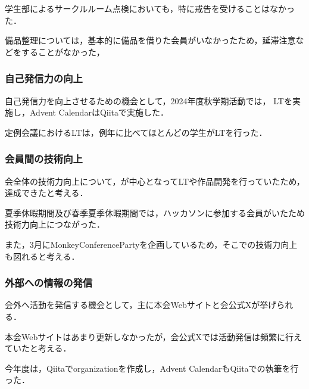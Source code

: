     学生部によるサークルルーム点検においても，特に戒告を受けることはなかった．


    備品整理については，基本的に備品を借りた会員がいなかったため，延滞注意などをすることがなかった，


\subsubsection*{自己発信力の向上}
    自己発信力を向上させるための機会として，2024年度秋学期活動では，
    LTを実施し，Advent CalendarはQiitaで実施した．

    定例会議におけるLTは，例年に比べてほとんどの学生がLTを行った．

\subsubsection*{会員間の技術向上}
    会全体の技術力向上について，\firstGrade{}が中心となってLTや作品開発を行っていたため，達成できたと考える．

    夏季休暇期間及び春季夏季休暇期間では，ハッカソンに参加する会員がいたため技術力向上につながった．

    また，3月にMonkeyConferencePartyを企画しているため，そこでの技術力向上も図れると考える．

\subsubsection*{外部への情報の発信}
    会外へ活動を発信する機会として，主に本会Webサイトと会公式Xが挙げられる．

    本会Webサイトはあまり更新しなかったが，会公式Xでは活動発信は頻繁に行えていたと考える．

    今年度は，Qiitaでorganizationを作成し，Advent CalendarもQiitaでの執筆を行った．

